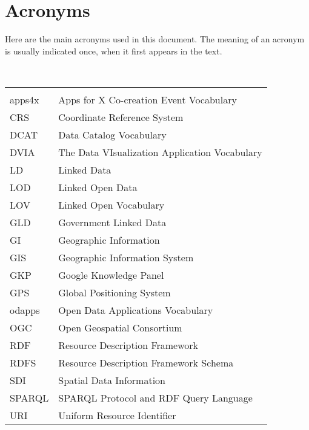 

\chapter*{Acronyms}

Here are the main acronyms used in this document. The meaning of an acronym is usually indicated once, when it first appears in the text. 

 \\

\begin{longtable}{lp{11cm}}
  &\\
  apps4x	 & Apps for X Co-creation Event Vocabulary\\
  CRS &  Coordinate Reference System\\
  
  DCAT & 	Data Catalog Vocabulary\\
  DVIA & The Data VIsualization Application Vocabulary\\
  
  
  LD  &  Linked Data\\
  LOD &  Linked Open Data\\ 
  
  
  LOV &  Linked Open Vocabulary\\
  
  GLD &  Government Linked Data\\
  GI  &  Geographic Information\\
  GIS &  Geographic Information System\\
  GKP &  Google Knowledge Panel \\
  GPS &  Global Positioning System \\
  
  odapps	 & Open Data Applications Vocabulary\\
  OGC &  Open Geospatial Consortium\\
  
  RDF &  Resource Description Framework\\
  RDFS & Resource Description Framework Schema\\
  SDI  & Spatial Data Information\\
  SPARQL	 & SPARQL Protocol and RDF Query Language\\
  URI &	Uniform Resource Identifier\\
  







  
  
 
\end{longtable}
